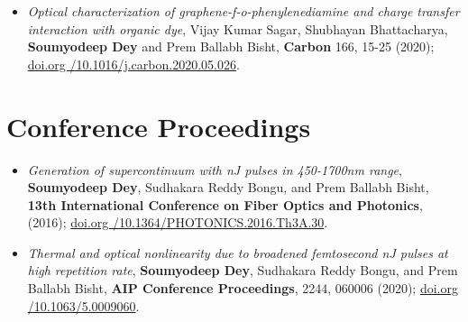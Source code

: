 \documentclass[11pt,a4paper,sans]{moderncv}        %
\begin{document}
\begin{itemize}
	\vspace{6pt}
	
	\item{\emph{Optical characterization of graphene-f-o-phenylenediamine and charge transfer interaction with organic dye}, Vijay Kumar Sagar, Shubhayan Bhattacharya, \textbf{Soumyodeep Dey} and Prem Ballabh Bisht, \textbf{Carbon} 166, 15-25 (2020); \href{doi.org /10.1016/j.carbon.2020.05.026}{\color{blue}doi.org /10.1016/j.carbon.2020.05.026}.}
	
	\vspace{6pt}	
	
\end{itemize}

\section{Conference Proceedings}
\begin{itemize}
	\item{\emph{Generation of supercontinuum with nJ pulses in 450-1700nm range}, \textbf{Soumyodeep Dey}, Sudhakara Reddy Bongu, and Prem Ballabh Bisht, \textbf{13th International Conference on Fiber Optics and Photonics}, (2016); \href{doi.org /10.1364/PHOTONICS.2016.Th3A.30}{\color{blue}doi.org /10.1364/PHOTONICS.2016.Th3A.30}.}
	
	\vspace{6pt}
	
	\item{\emph{Thermal and optical nonlinearity due to broadened femtosecond nJ pulses at high repetition rate}, \textbf{Soumyodeep Dey}, Sudhakara Reddy Bongu, and Prem Ballabh Bisht, \textbf{AIP Conference Proceedings}, 2244, 060006 (2020); \href{doi.org /10.1063/5.0009060}{\color{blue}doi.org /10.1063/5.0009060}.}
\end{itemize}
\end{document}
